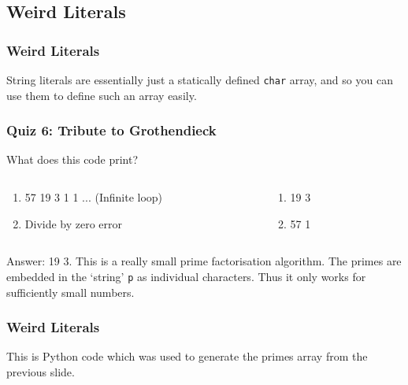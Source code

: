 \documentclass[handout,xcolor]{beamer}
\begin{document}
\subsection{Weird Literals}

\begin{frame}
	\frametitle{Weird Literals}
	\pause
	
	String literals are essentially just a statically defined \texttt{char} array, and so you can use them to define such an array easily.
\end{frame}

\begin{frame}
	\frametitle{Quiz 6: Tribute to Grothendieck}
	\pause
	
	What does this code print?
	\pause
	
	
	\pause
	
	\begin{columns}
		\begin{column}{0.45\textwidth}
			\begin{enumerate}
				\footnotesize
				\item 57 19 3 1 1 ... (Infinite loop)
				\pause
				\item Divide by zero error
			\end{enumerate}
		\end{column}
		\pause
		\begin{column}{0.45\textwidth}
			\begin{enumerate}
				\footnotesize
				\setcounter{enumi}{2}
				\item 19 3
				\pause
				\item 57 1
			\end{enumerate}
		\end{column}
	\end{columns}
	\pause
	
	\vspace{0.2cm}
	
	\footnotesize
	Answer: 19 3. \pause This is a really small prime factorisation algorithm. \pause The primes are embedded in the `string' \texttt{p} as individual characters. \pause Thus it only works for sufficiently small numbers.
\end{frame}

\begin{frame}
	\frametitle{Weird Literals}
	\pause
	
	This is Python code which was used to generate the primes array from the previous slide.
	\pause
	
	
\end{frame}
\end{document}
